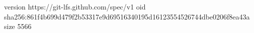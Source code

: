 version https://git-lfs.github.com/spec/v1
oid sha256:861f4b699d479f2b53317e9d69516340195d16123554526744dbe0206f8ea43a
size 5566
